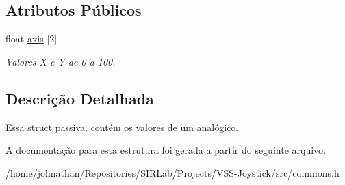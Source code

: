 \subsection*{Atributos Públicos}
\begin{DoxyCompactItemize}
\item 
float \hyperlink{structJoyAxis_a498ad3b5a8666cad1d7ab2b8dde73d08}{axis} \mbox{[}2\mbox{]}\hypertarget{structJoyAxis_a498ad3b5a8666cad1d7ab2b8dde73d08}{}\label{structJoyAxis_a498ad3b5a8666cad1d7ab2b8dde73d08}

\begin{DoxyCompactList}\small\item\em Valores X e Y de 0 a 100. \end{DoxyCompactList}\end{DoxyCompactItemize}


\subsection{Descrição Detalhada}
Essa struct passiva, contém os valores de um analógico. 

A documentação para esta estrutura foi gerada a partir do seguinte arquivo\+:\begin{DoxyCompactItemize}
\item 
/home/johnathan/\+Repositories/\+S\+I\+R\+Lab/\+Projects/\+V\+S\+S-\/\+Joystick/src/commons.\+h\end{DoxyCompactItemize}
